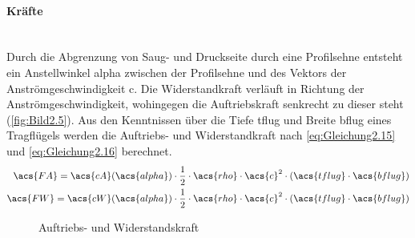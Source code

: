 \paragraph{Kräfte}\mbox{}\smallskip\\
Durch die Abgrenzung von Saug- und Druckseite durch eine Profilsehne entsteht ein Anstellwinkel \acs{alpha} zwischen der Profilsehne und des Vektors der Anströmgeschwindigkeit \acs{c}. Die Widerstandkraft verläuft in Richtung der Anströmgeschwindigkeit, wohingegen die Auftriebskraft senkrecht zu dieser steht (\autoref{fig:Bild2.5}). Aus den Kenntnissen über die Tiefe \acs{tflug} und Breite \acs{bflug} eines Tragflügels werden die Auftriebs- und Widerstandkraft nach \autoref{eq:Gleichung2.15} und \autoref{eq:Gleichung2.16} berechnet.
\begin{align}
    \acs{FA} = \acs{cA}(\acs{alpha}) \cdot \frac{1}{2} \cdot \acs{rho} \cdot \acs{c}^2 \cdot (\acs{tflug} \cdot \acs{bflug}) \label{eq:Gleichung2.15} \\
    \acs{FW} = \acs{cW}(\acs{alpha}) \cdot \frac{1}{2} \cdot \acs{rho} \cdot \acs{c}^2 \cdot (\acs{tflug} \cdot \acs{bflug}) \label{eq:Gleichung2.16}
\end{align}
\begin{figure}[H]
   \centering
   \caption[Auftriebs- und Widerstandskraft]{Auftriebs- und Widerstandskraft}
   \label{fig:Bild2.5}
\end{figure}

